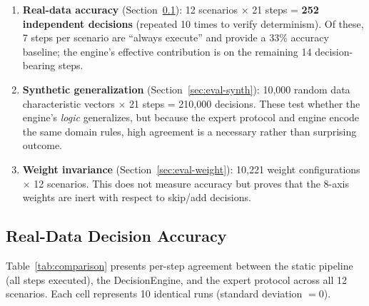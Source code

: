 \documentclass[11pt,a4paper]{article}
\begin{document}
\begin{enumerate}
  \item \textbf{Real-data accuracy} (Section~\ref{sec:eval-real}):
    12 scenarios $\times$ 21 steps = \textbf{252 independent
    decisions} (repeated 10 times to verify determinism).
    Of these, 7 steps per scenario are ``always execute'' and
    provide a 33\% accuracy baseline; the engine's effective
    contribution is on the remaining 14 decision-bearing steps.

  \item \textbf{Synthetic generalization} (Section~\ref{sec:eval-synth}):
    10,000 random data characteristic vectors $\times$ 21 steps
    = 210,000 decisions.
    These test whether the engine's \textit{logic} generalizes, but
    because the expert protocol and engine encode the same domain
    rules, high agreement is a necessary rather than surprising
    outcome.

  \item \textbf{Weight invariance} (Section~\ref{sec:eval-weight}):
    10,221 weight configurations $\times$ 12 scenarios.
    This does not measure accuracy but proves that the 8-axis
    weights are inert with respect to skip/add decisions.
\end{enumerate}

\subsection{Real-Data Decision Accuracy}
\label{sec:eval-real}

Table~\ref{tab:comparison} presents per-step agreement between the
static pipeline (all steps executed), the DecisionEngine, and the
expert protocol across all 12 scenarios.
Each cell represents 10 identical runs (standard deviation $= 0$).
\end{document}
